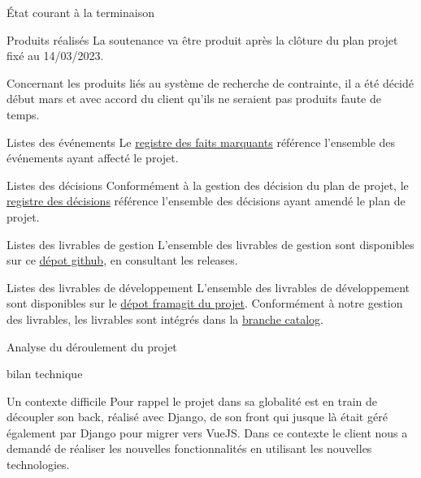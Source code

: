 \documentclass[]{article}
\begin{document}
{\begin{section}{État courant à la terminaison}
\begin{subsection}{Produits réalisés}
     La soutenance va être produit après la clôture du plan projet fixé au 14/03/2023.

     Concernant les produits liés au système de recherche de contrainte, il a été décidé début mars et avec accord du client qu’ils ne seraient pas produits faute de temps.
 \end{subsection}

 \begin{subsection}{Listes des événements}
     Le \href{Registre_des_faits_marquants.pdf}{registre des faits marquants} référence l'ensemble des événements ayant affecté le projet.
 \end{subsection}

 \begin{subsection}{Listes des décisions}
     Conformément à la gestion des décision du plan de projet, le \href{Registre_des_décisions.pdf}{registre des décisions} référence l'ensemble des décisions ayant amendé le plan de projet.
 \end{subsection}

 \begin{subsection}{Listes des livrables de gestion}
     L'ensemble des livrables de gestion sont disponibles sur ce \href{https://github.com/Szyckaa/UE-PROJET-DOCS-GESTION}{dépot github}, en consultant les releases.
 \end{subsection}

 \newpage

 \begin{subsection}{Listes des livrables de développement}
     L'ensemble des livrables de développement sont disponibles sur le \href{https://framagit.org/flopedt/FlOpEDT}{dépot framagit du projet}. Conformément à notre gestion des livrables, les livrables sont intégrés dans la \href{https://framagit.org/flopedt/FlOpEDT/-/tree/catalog}{branche catalog}.
 \end{subsection}
\end{section}

\begin{section}{Analyse du déroulement du projet}
 \begin{subsection}{bilan technique}
     \begin{subsubsection}{Un contexte difficile}
         Pour rappel le projet dans sa globalité est en train de découpler son back, réalisé avec Django, de son front qui jusque là était géré également par Django pour migrer vers VueJS. Dans ce contexte le client nous a demandé de réaliser les nouvelles fonctionnalités en utilisant les nouvelles technologies.


\end{subsubsection}
\end{subsection}
\end{section}}
\end{document}
